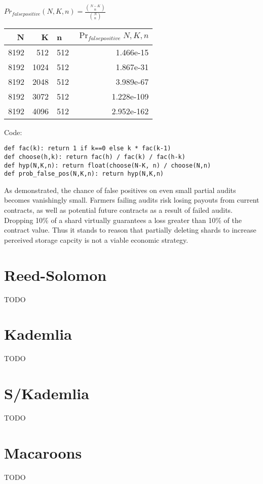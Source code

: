 \documentclass[a4paper,10pt]{article}
\newcommand{\todo}[1]{{\color{red} TODO #1}}
\begin{document}
{\centering
$Pr_{false positive}(N,K,n) = \displaystyle \frac{{N-K \choose n}} {{N \choose
n}}$
\\}

\begin{table}[hbt!]
\begin{center}
\begin{tabular}{r r l r}
N & K & n & $\Pr_{falsepositive}{N,K,n}$\\
\hline 8192 & 512  & 512 & 1.466e-15\\
\hline 8192 & 1024 & 512 & 1.867e-31\\
\hline 8192 & 2048 & 512 & 3.989e-67\\
\hline 8192 & 3072 & 512 & 1.228e-109\\
\hline 8192 & 4096 & 512 & 2.952e-162\\
\end{tabular}
\end{center}
\end{table}

Code:
\begin{lstlisting}
def fac(k): return 1 if k==0 else k * fac(k-1)
def choose(h,k): return fac(h) / fac(k) / fac(h-k)
def hyp(N,K,n): return float(choose(N-K, n) / choose(N,n)
def prob_false_pos(N,K,n): return hyp(N,K,n)
\end{lstlisting}

As demonstrated, the chance of false positives on even small partial audits
becomes vanishingly small. Farmers failing audits risk losing payouts from
current contracts, as well as potential future contracts as a result of failed
audits. Dropping 10\% of a shard virtually guarantees a loss greater than 10\%
of the contract value. Thus it stands to reason that partially deleting shards
to increase perceived storage capcity is not a viable economic strategy.

\section{Reed-Solomon}

\todo{}

\section{Kademlia}

\todo{}

\section{S/Kademlia}

\todo{}

\section{Macaroons}

\todo{}

\newpage

\begingroup
  \raggedright
  
\endgroup
\end{document}
